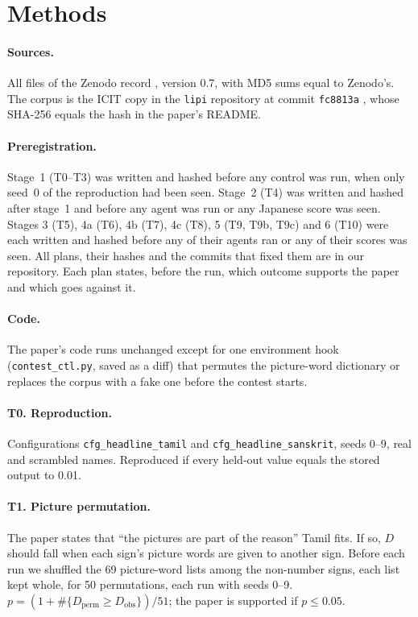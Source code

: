 \documentclass[11pt,a4paper]{article}
\begin{document}
\section{Methods}\label{sec:methods}

\paragraph{Sources.} All files of the Zenodo record \citep{raj2026}, version 0.7, with MD5 sums equal to Zenodo's. The corpus is the ICIT copy \citep{icit} in the \texttt{lipi} repository at commit \texttt{fc8813a} \citep{lipi}, whose SHA-256 equals the hash in the paper's README.

\paragraph{Preregistration.} Stage~1 (T0--T3) was written and hashed before any control was run, when only seed~0 of the reproduction had been seen. Stage~2 (T4) was written and hashed after stage~1 and before any agent was run or any Japanese score was seen. Stages 3 (T5), 4a (T6), 4b (T7), 4c (T8), 5 (T9, T9b, T9c) and 6 (T10) were each written and hashed before any of their agents ran or any of their scores was seen. All plans, their hashes and the commits that fixed them are in our repository. Each plan states, before the run, which outcome supports the paper and which goes against it.

\paragraph{Code.} The paper's code runs unchanged except for one environment hook (\texttt{contest\_ctl.py}, saved as a diff) that permutes the picture-word dictionary or replaces the corpus with a fake one before the contest starts.

\paragraph{T0. Reproduction.} Configurations \texttt{cfg\_headline\_tamil} and \texttt{cfg\_headline\_sanskrit}, seeds 0--9, real and scrambled names. Reproduced if every held-out value equals the stored output to 0.01.

\paragraph{T1. Picture permutation.} The paper states that ``the pictures are part of the reason'' Tamil fits. If so, $D$ should fall when each sign's picture words are given to another sign. Before each run we shuffled the 69 picture-word lists among the non-number signs, each list kept whole, for 50 permutations, each run with seeds 0--9. $p = (1+\#\{D_{\text{perm}}\ge D_{\text{obs}}\})/51$; the paper is supported if $p\le0.05$.
\end{document}
